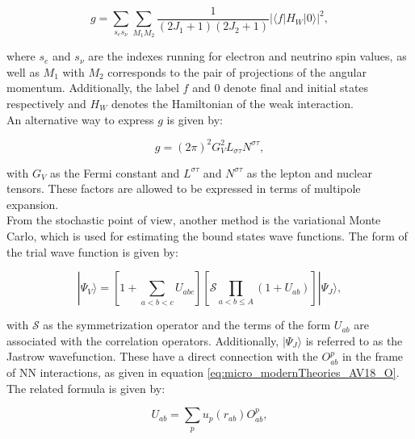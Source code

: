 \documentclass[openany]{book}
\begin{document}
\begin{equation}\label{eq:micro_modernTheories_weak_crossSection_g}
	g = \sum_{s_e s_\nu} \sum_{M_1 M_2} {\frac{1}{(2J_1 + 1)(2J_2 + 1)}|\langle f | H_{W} |0 \rangle|^2 },
\end{equation}

where $s_e$ and $s_\nu$ are the indexes running for electron and neutrino spin values, as well as $M_1$ with $M_2$ corresponds to the pair of projections of the angular momentum. Additionally, the label $f$ and $0$ denote final and initial states respectively and $H_W$ denotes the Hamiltonian of the weak interaction. \\

An alternative way to express $g$ is given by:

\begin{equation}\label{eq:micro_modernTheories_weak_crossSection_g_alternative}
	g = (2\pi)^2 G^{2}_V L_{\sigma \tau} N^{\sigma \tau},
\end{equation}

with $G_V$ as the Fermi constant and $L^{\sigma \tau}$ and $N^{\sigma \tau}$ as the lepton and nuclear tensors. These factors are allowed to be expressed in terms of multipole expansion. \\

From the stochastic point of view, another method is the variational Monte Carlo, which is used for estimating the bound states wave functions. The form of the trial wave function is given by:

\begin{equation}\label{eq:micro_modernTheories_variationalMonteCarlo}
	| \Psi_V \rangle = \left[ 1 + \sum_{a < b < c} U_{abc}\right]  \left[ \mathcal{S}  \prod_{a < b \le A } {(1 + U_{ab})}\right] | \Psi_J\rangle ,
\end{equation}

with $\mathcal{S}$ as the symmetrization operator and the terms of the form $U_{ab}$ are associated with the correlation operators. Additionally, $|\Psi_J\rangle$ is referred to as the Jastrow wavefunction.  These have a direct connection with the $O^{p}_{ab}$ in the frame of NN interactions, as given in equation \ref{eq:micro_modernTheories_AV18_O}. The related formula is given by:

\begin{equation}\label{eq:micro_modernTheories_variationalMonteCarlo_correlation}
	U_{ab} = \sum_{p} u_{p}(r_{ab}) O^{p}_{ab},
\end{equation}
\end{document}
